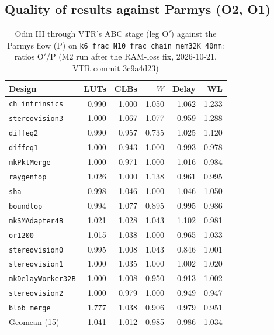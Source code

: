 \documentclass[conference]{IEEEtran}
\newcommand{\code}[1]{\texttt{#1}}
\begin{document}
\subsection{Quality of results against Parmys (O2, O1)}
\label{sec:q-qor}


\begin{table}[t]
\caption{Odin III through VTR's ABC stage (leg O$'$) against the Parmys flow (P) on
\code{k6\_frac\_N10\_frac\_chain\_mem32K\_40nm}: ratios O$'$/P (M2 run after the RAM-loss fix, 2026-10-21, VTR commit
3c9a4d23)}
\label{tab:m2}
\centering
\footnotesize
\setlength{\tabcolsep}{3.5pt}
\begin{tabular}{@{}lrrrrr@{}}
\toprule
Design & LUTs & CLBs & $W$ & Delay & WL \\
\midrule
\code{ch\_intrinsics} & 0.990 & 1.000 & 1.050 & 1.062 & 1.233 \\
\code{stereovision3} & 1.000 & 1.067 & 1.077 & 0.959 & 1.288 \\
\code{diffeq2} & 0.990 & 0.957 & 0.735 & 1.025 & 1.120 \\
\code{diffeq1} & 1.000 & 0.943 & 1.000 & 0.993 & 0.978 \\
\code{mkPktMerge} & 1.000 & 0.971 & 1.000 & 1.016 & 0.984 \\
\code{raygentop} & 1.026 & 1.000 & 1.138 & 0.961 & 0.995 \\
\code{sha} & 0.998 & 1.046 & 1.000 & 1.046 & 1.050 \\
\code{boundtop} & 0.994 & 1.077 & 0.895 & 0.995 & 0.986 \\
\code{mkSMAdapter4B} & 1.021 & 1.028 & 1.043 & 1.102 & 0.981 \\
\code{or1200} & 1.015 & 1.038 & 1.000 & 0.965 & 1.033 \\
\code{stereovision0} & 0.995 & 1.008 & 1.043 & 0.846 & 1.001 \\
\code{stereovision1} & 1.000 & 1.035 & 1.000 & 1.002 & 1.020 \\
\code{mkDelayWorker32B} & 1.000 & 1.008 & 0.950 & 0.913 & 1.002 \\
\code{stereovision2} & 1.000 & 0.979 & 1.000 & 0.949 & 0.947 \\
\code{blob\_merge} & 1.777 & 1.038 & 0.906 & 0.979 & 0.951 \\
\midrule
Geomean (15) & 1.041 & 1.012 & 0.985 & 0.986 & 1.034 \\
\bottomrule
\end{tabular}
\end{table}
\end{document}
